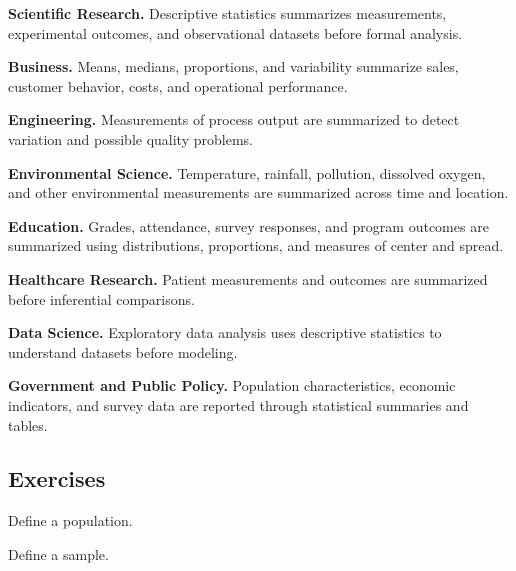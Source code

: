 \begin{applicationbox}

\textbf{Scientific Research.}
Descriptive statistics summarizes measurements, experimental outcomes,
and observational datasets before formal analysis.

\medskip

\textbf{Business.}
Means, medians, proportions, and variability summarize sales, customer
behavior, costs, and operational performance.

\medskip

\textbf{Engineering.}
Measurements of process output are summarized to detect variation and
possible quality problems.

\medskip

\textbf{Environmental Science.}
Temperature, rainfall, pollution, dissolved oxygen, and other
environmental measurements are summarized across time and location.

\medskip

\textbf{Education.}
Grades, attendance, survey responses, and program outcomes are summarized
using distributions, proportions, and measures of center and spread.

\medskip

\textbf{Healthcare Research.}
Patient measurements and outcomes are summarized before inferential
comparisons.

\medskip

\textbf{Data Science.}
Exploratory data analysis uses descriptive statistics to understand
datasets before modeling.

\medskip

\textbf{Government and Public Policy.}
Population characteristics, economic indicators, and survey data are
reported through statistical summaries and tables.

\end{applicationbox}

\subsection{Exercises}
\label{subsec:descriptive-statistics-exercises}

\begin{exercise}[1]
Define a population.
\end{exercise}

\begin{exercise}[1]
Define a sample.
\end{exercise}

